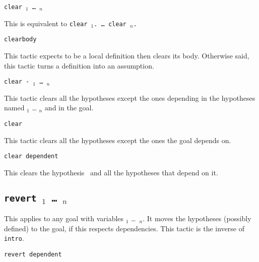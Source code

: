 \begin{coq_example*}
\begin{Variants}

\item {\tt clear {\ident$_1$} \dots\ {\ident$_n$}}

  This is equivalent to {\tt clear {\ident$_1$}. {\ldots} clear
    {\ident$_n$}.}

\item {\tt clearbody {\ident}}

  This tactic expects {\ident} to be a local definition then clears
  its body. Otherwise said, this tactic turns a definition into an
  assumption.

  \ErrMsg {}

\item \texttt{clear - {\ident$_1$} \dots\ {\ident$_n$}}

  This tactic clears all the hypotheses except the ones depending in
  the hypotheses named {\ident$_1$} {\ldots} {\ident$_n$} and in the
  goal.

\item \texttt{clear}

  This tactic clears all the hypotheses except the ones the goal depends on.

\item {\tt clear dependent \ident {}}

 This clears the hypothesis \ident\ and all the hypotheses
 that depend on it.

\end{Variants}

\subsection{\tt revert \ident$_1$ \dots\ \ident$_n$}
\label{revert}

This applies to any goal with variables \ident$_1$ \dots\ \ident$_n$.
It moves the hypotheses (possibly defined) to the goal, if this respects
dependencies. This tactic is the inverse of {\tt intro}.

\begin{ErrMsgs}
\item {}
\item {}
\end{ErrMsgs}

\begin{Variants}
\item {\tt revert dependent \ident {}}


\end{Variants}
\end{coq_example*}
